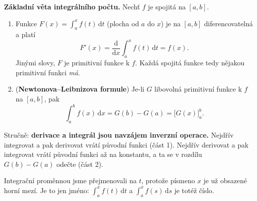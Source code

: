 \begin{definitionbox}
  \textbf{Základní věta integrálního počtu.} Nechť $f$ je spojitá na $[a, b]$.
  \begin{enumerate}
    \item Funkce $F(x) = \displaystyle\int_a^x f(t)\,\mathrm{d}t$ (plocha od $a$ do $x$) je na $[a, b]$ diferencovatelná a platí
    \begin{equation*}
      F'(x) = \frac{\mathrm{d}}{\mathrm{d}x}\int_a^x f(t)\,\mathrm{d}t = f(x).
    \end{equation*}
    Jinými slovy, $F$ je primitivní funkce k $f$. Každá spojitá funkce tedy nějakou primitivní funkci \textit{má}.
    \item (\textbf{Newtonova--Leibnizova formule}) Je-li $G$ libovolná primitivní funkce k $f$ na $[a, b]$, pak
    \begin{equation*}
      \int_a^b f(x)\,\mathrm{d}x = G(b) - G(a) = {\big[G(x)\big]}_a^b.
    \end{equation*}
  \end{enumerate}
  Stručně: \textbf{derivace a integrál jsou navzájem inverzní operace.} Nejdřív integrovat a pak derivovat vrátí původní funkci (část 1). Nejdřív derivovat a pak integrovat vrátí původní funkci až na konstantu, a ta se v rozdílu $G(b) - G(a)$ odečte (část 2).
\end{definitionbox}

Integrační proměnnou jsme přejmenovali na $t$, protože písmeno $x$ je už obsazené horní mezí. Je to jen jméno: $\int_a^x f(t)\,\mathrm{d}t$ a $\int_a^x f(s)\,\mathrm{d}s$ je totéž číslo.


